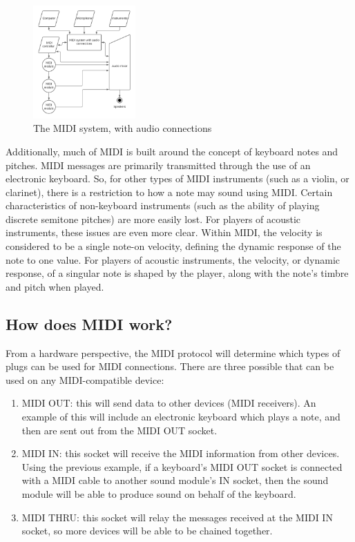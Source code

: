 \begin{figure}
	\centering
	\includegraphics[width=0.35\textwidth]{figures/midi-system-with-audio-connections.png}
	\caption{The MIDI system, with audio connections}
	\label{fig:midi-system-with-audio-connections}
\end{figure}

Additionally, much of MIDI is built around the concept of keyboard notes and pitches. MIDI messages are primarily transmitted through the use of an electronic keyboard. So, for other types of MIDI instruments (such as a violin, or clarinet), there is a restriction to how a note may sound using MIDI. Certain characteristics of non-keyboard instruments (such as the ability of playing discrete semitone pitches) are more easily lost. For players of acoustic instruments, these issues are even more clear. Within MIDI, the velocity is considered to be a single note-on velocity, defining the dynamic response of the note to one value. For players of acoustic instruments, the velocity, or dynamic response, of a singular note is shaped by the player, along with the note's timbre and pitch when played\cite{Kirk_Hunt_2013}.


\subsection[How does MIDI work?]{How does MIDI work?}\label{subsection:how-midi}
From a hardware perspective, the MIDI protocol will determine which types of plugs can be used for MIDI connections. There are three possible  that can be used on any MIDI-compatible device:

\begin{enumerate}
	\item MIDI OUT: this will send data to other devices (MIDI receivers). An example of this will include an electronic keyboard which plays a note, and then  are sent out from the MIDI OUT socket.
	\item MIDI IN: this socket will receive the MIDI information from other devices. Using the previous example, if a keyboard's MIDI OUT socket is connected with a MIDI cable to another sound module's IN socket, then the sound module will be able to produce sound on behalf of the keyboard.
	\item MIDI THRU: this socket will relay the messages received at the MIDI IN socket, so more devices will be able to be chained together.
\end{enumerate}\label{enu:list-of-midi-sockets}

